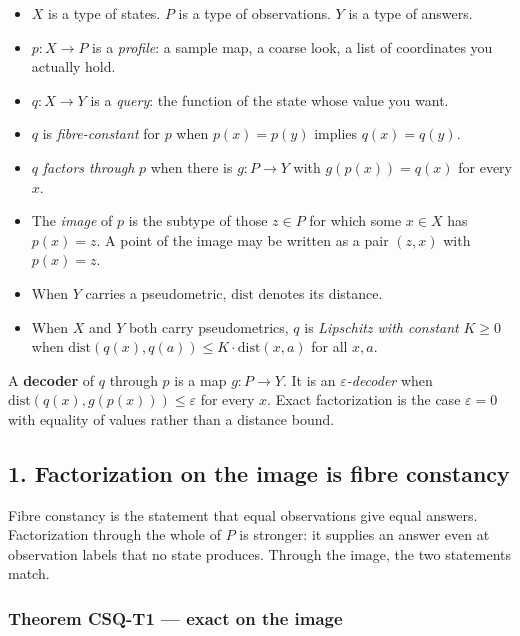\documentclass[
  11pt,
]{article}
\providecommand{\tightlist}{%
  \setlength{\itemsep}{0pt}\setlength{\parskip}{0pt}}
\begin{document}
\begin{itemize}
\tightlist
\item
  \(X\) is a type of states. \(P\) is a type of observations. \(Y\) is a type of answers.
\item
  \(p:X\to P\) is a \emph{profile}: a sample map, a coarse look, a list of coordinates you actually hold.
\item
  \(q:X\to Y\) is a \emph{query}: the function of the state whose value you want.
\item
  \(q\) is \emph{fibre-constant} for \(p\) when \(p(x)=p(y)\) implies \(q(x)=q(y)\).
\item
  \(q\) \emph{factors through} \(p\) when there is \(g:P\to Y\) with \(g(p(x))=q(x)\) for every \(x\).
\item
  The \emph{image} of \(p\) is the subtype of those \(z\in P\) for which some \(x\in X\) has \(p(x)=z\). A point of the image may be written as a pair \((z,x)\) with \(p(x)=z\).
\item
  When \(Y\) carries a pseudometric, \(\mathrm{dist}\) denotes its distance.
\item
  When \(X\) and \(Y\) both carry pseudometrics, \(q\) is \emph{Lipschitz with constant} \(K\ge 0\) when \(\mathrm{dist}(q(x),q(a))\le K\cdot\mathrm{dist}(x,a)\) for all \(x,a\).
\end{itemize}

A \textbf{decoder} of \(q\) through \(p\) is a map \(g:P\to Y\). It is an \emph{\(\varepsilon\)-decoder} when \(\mathrm{dist}(q(x),g(p(x)))\le\varepsilon\) for every \(x\). Exact factorization is the case \(\varepsilon=0\) with equality of values rather than a distance bound.

\subsection{1. Factorization on the image is fibre constancy}\label{factorization-on-the-image-is-fibre-constancy}

Fibre constancy is the statement that equal observations give equal answers. Factorization through the whole of \(P\) is stronger: it supplies an answer even at observation labels that no state produces. Through the image, the two statements match.

\subsubsection{Theorem CSQ-T1 --- exact on the image}\label{theorem-csq-t1-exact-on-the-image}
\end{document}
